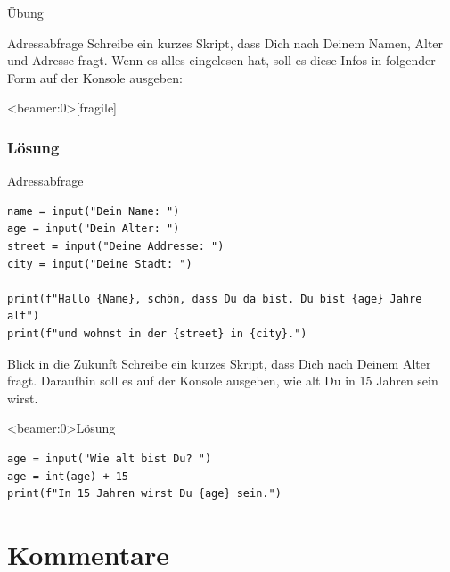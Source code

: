 \begin{frame}{Übung}
\begin{block}{Adressabfrage}
\vspace{2pt}
Schreibe ein kurzes Skript, dass Dich nach Deinem Namen, Alter und Adresse fragt. Wenn es alles eingelesen hat, soll es diese Infos in folgender Form auf der Konsole ausgeben: 	

\end{block}
\end{frame}

\begin{frame}<beamer:0>[fragile]
\frametitle{Lösung}
\begin{solutionblock}{Adressabfrage}
\begin{verbatim}
name = input("Dein Name: ")
age = input("Dein Alter: ")
street = input("Deine Addresse: ")
city = input("Deine Stadt: ") 

print(f"Hallo {Name}, schön, dass Du da bist. Du bist {age} Jahre alt")
print(f"und wohnst in der {street} in {city}.")
\end{verbatim}
\end{solutionblock}
\end{frame}



\begin{fragile}[Übung]
\begin{block}{Blick in die Zukunft}
	\vspace{2pt}
Schreibe ein kurzes Skript, dass Dich nach Deinem Alter fragt. Daraufhin soll es auf der Konsole ausgeben, wie alt Du in 15 Jahren sein wirst. 
\end{block}
\vspace{12pt}
\begin{solutionblock}<beamer:0>{Lösung}
\begin{verbatim}
age = input("Wie alt bist Du? ")
age = int(age) + 15
print(f"In 15 Jahren wirst Du {age} sein.")
\end{verbatim}
\end{solutionblock}
\end{fragile}

\section{Kommentare}

